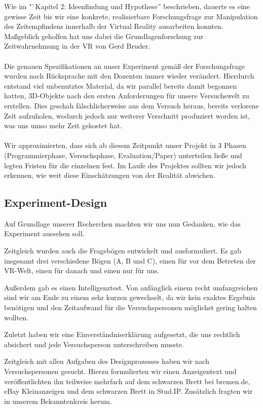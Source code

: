 \documentclass{Bericht}
\begin{document}
		Wie im "`Kapitel 2: Ideenfindung und Hypothese'' beschrieben, dauerte es eine gewisse Zeit bis wir eine konkrete, realisierbare Forschungsfrage zur Manipulation des Zeitempfindens innerhalb der Virtual Reality ausarbeiten konnten. Maßgeblich geholfen hat uns dabei die Grundlagenforschung zur Zeitwahrnehmung in der VR von Gerd Bruder.\\
\\
		Die genauen Spezifikationen an unser Experiment gemäß der Forschungsfrage wurden nach Rücksprache mit den Dozenten immer wieder verändert. Hierdurch entstand viel unbenutztes Material, da wir parallel bereits damit begonnen hatten, 3D-Objekte nach den ersten Anforderungen für unsere Versuchswelt zu erstellen. Dies geschah fälschlicherweise aus dem Versuch heraus, bereits verlorene Zeit aufzuholen, wodurch jedoch nur weiterer Verschnitt produziert worden ist, was uns umso mehr Zeit gekostet hat.\\
\\
		Wir approximierten, dass sich ab diesem Zeitpunkt unser Projekt in 3 Phasen (Programmierphase, Versuchsphase, Evaluation/Paper) unterteilen ließe und legten Fristen für die einzelnen fest. Im Laufe des Projektes sollten wir jedoch erkennen, wie weit diese Einschätzungen von der Realität abwichen.

	\subsection{Experiment-Design} %
		Auf Grundlage unserer Recherchen machten wir uns nun Gedanken, wie das Experiment aussehen soll. 
		
		Zeitgleich wurden auch die Fragebögen entwickelt und ausformuliert. Es gab insgesamt drei verschiedene Bögen (A, B und C), einen für vor dem Betreten der VR-Welt, einen für danach und einen nur für uns.
			
		Außerdem gab es einen Intelligenztest. Von anfänglich einem recht umfangreichen sind wir am Ende zu einem sehr kurzen gewechselt, da wir kein exaktes Ergebnis benötigen und den Zeitaufwand für die Versuchspersonen möglichst gering halten wollten.
			
		Zuletzt haben wir eine Einverständniserklärung aufgesetzt, die uns rechtlich absichert und jede Versuchsperson unterschreiben musste.
			
		Zeitgleich mit allen Aufgaben des Designprozesses haben wir nach Versuchspersonen gesucht. Hierzu formulierten wir einen Anzeigentext und veröffentlichten ihn teilweise mehrfach auf dem schwarzen Brett bei bremen.de, eBay Kleinanzeigen und dem schwarzen Brett in Stud.IP. Zusätzlich fragten wir in unserem Bekanntenkreis herum. 
			
\end{document}
